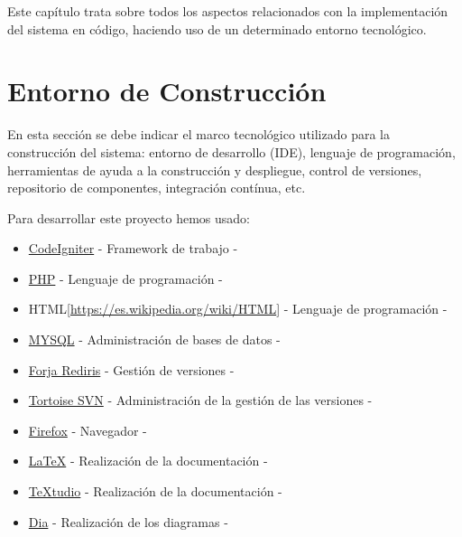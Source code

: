 

Este capítulo trata sobre todos los aspectos relacionados con la implementación del sistema en código, haciendo uso de un determinado entorno tecnológico.

\section{Entorno de Construcción}
En esta sección se debe indicar el marco tecnológico utilizado para la construcción del sistema: entorno de desarrollo (IDE), lenguaje de programación, herramientas de ayuda a la construcción y despliegue, control de versiones, repositorio de componentes, integración contínua, etc.

Para desarrollar este proyecto hemos usado:

\begin{itemize}
	\item \href{http://www.codeigniter.com/}{CodeIgniter} - Framework de trabajo - \cite{CodeIgniter}
	\item \href{https://secure.php.net/}{PHP} - Lenguaje de programación - \cite{PHP}
	\item HTML[\url{https://es.wikipedia.org/wiki/HTML}] - Lenguaje de programación - \cite{HTML}
	\item \href{https://www.mysql.com/}{MYSQL}  - Administración de bases de datos - \cite{MYSQL}
	\item \href{https://forja.rediris.es/}{Forja Rediris}  - Gestión de versiones - \cite{ForjaRediris}
	\item \href{http://tortoisesvn.net/}{Tortoise SVN}  - Administración de la gestión de las versiones - \cite{TortoiseSVN}
	\item \href{https://www.mozilla.org/es-ES/}{Firefox}  - Navegador - \cite{Firefox}
	\item \href{http://www.latex-project.org/}{LaTeX}  - Realización de la documentación - \cite{LaTeX}
	\item \href{http://www.texstudio.org/}{TeXtudio} - Realización de la documentación - \cite{TeXtudio}
	\item \href{http://dia-installer.de/index.html.es}{Dia} - Realización de los diagramas - \cite{Dia}	
\end{itemize}

